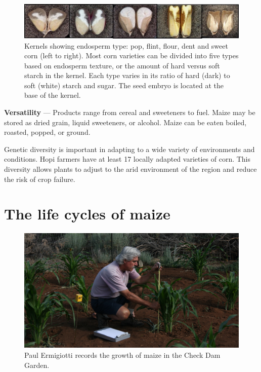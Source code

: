 \documentclass[12pt,]{article}
\begin{document}
\begin{figure}
\centering
\includegraphics{./images/endosperm_types.jpg}
\caption{Kernels showing endosperm type: pop, flint, flour, dent and sweet corn (left to right). Most corn varieties can be divided into five types based on endosperm texture, or the amount of hard versus soft starch in the kernel. Each type varies in its ratio of hard (dark) to soft (white) starch and sugar. The seed embryo is located at the base of the kernel.}
\end{figure}

\textbf{Versatility} --- Products range from cereal and sweeteners to fuel. Maize may be stored as dried grain, liquid sweeteners, or alcohol. Maize can be eaten boiled, roasted, popped, or ground.

Genetic diversity is important in adapting to a wide variety of environments and conditions. Hopi farmers have at least 17 locally adapted varieties of corn. This diversity allows plants to adjust to the arid environment of the region and reduce the risk of crop failure.

\hypertarget{the-life-cycles-of-maize}{%
\section{The life cycles of maize}\label{the-life-cycles-of-maize}}

\begin{figure}
\centering
\includegraphics{./images/chapter_3_header.jpg}
\caption{Paul Ermigiotti records the growth of maize in the Check Dam Garden.}
\end{figure}
\end{document}
